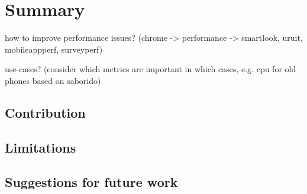 
\chapter{Summary}

how to improve performance issues? (chrome -> performance -> smartlook, uruit, mobileappperf, surveyperf)

use-cases? (consider which metrics are important in which cases, e.g. cpu for old phones based on saborido)

\section{Contribution}

\section{Limitations}

\section{Suggestions for future work}
